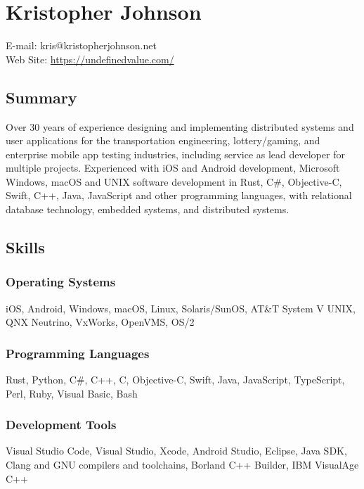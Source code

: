 \section{Kristopher Johnson}\label{kristopher-johnson}

E-mail: kris@kristopherjohnson.net\\
Web Site: \url{https://undefinedvalue.com/}

\subsection{Summary}\label{summary}

Over 30 years of experience designing and implementing distributed
systems and user applications for the transportation engineering,
lottery/gaming, and enterprise mobile app testing industries, including
service as lead developer for multiple projects. Experienced with iOS
and Android development, Microsoft Windows, macOS and UNIX software
development in Rust, C\#, Objective-C, Swift, C++, Java, JavaScript and
other programming languages, with relational database technology,
embedded systems, and distributed systems.

\subsection{Skills}\label{skills}

\subsubsection{Operating Systems}\label{operating-systems}

iOS, Android, Windows, macOS, Linux, Solaris/SunOS, AT\&T System V UNIX,
QNX Neutrino, VxWorks, OpenVMS, OS/2

\subsubsection{Programming Languages}\label{programming-languages}

Rust, Python, C\#, C++, C, Objective-C, Swift, Java, JavaScript,
TypeScript, Perl, Ruby, Visual Basic, Bash

\subsubsection{Development Tools}\label{development-tools}

Visual Studio Code, Visual Studio, Xcode, Android Studio, Eclipse, Java
SDK, Clang and GNU compilers and toolchains, Borland C++ Builder, IBM
VisualAge C++

